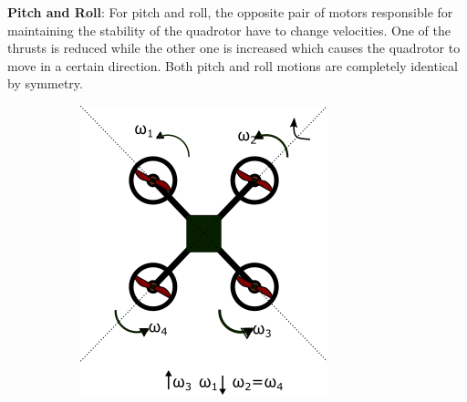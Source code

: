 \documentclass[hidelinks,BTech]{iitmdiss}
\begin{document}
{\bf Pitch and Roll}: For pitch and roll, the opposite pair of motors responsible for maintaining the stability of the quadrotor have to change velocities. One of the thrusts is reduced while the other one is increased which causes the quadrotor to move in a certain direction. Both pitch and roll motions are completely identical by symmetry.
\begin{figure}[H]
  \centering
    \begin{subfigure}[c]{0.45\textwidth}
      \centering
        \includegraphics[width=\textwidth]{Quadrotor_roll.png}
        \caption{}
    \end{subfigure}
    \quad
    \begin{subfigure}[c]{0.45\textwidth}
      \centering

\end{subfigure}
\end{figure}
\end{document}
